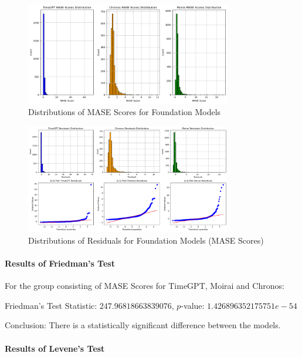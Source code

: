 \documentclass[12pt,a4paper]{article}
\begin{document}
\begin{figure}[htbp]
  \centering
  \includegraphics[width=0.8\textwidth]{mase_distribution_e.png}
  \caption{Distributions of MASE Scores for Foundation Models}
  \label{mase_distribution_e}
\end{figure}

\begin{figure}[htbp]
  \centering
  \includegraphics[width=0.8\textwidth]{residuals_distribution_e.png}
  \caption{Distributions of Residuals for Foundation Models (MASE Scores)} 
  \label{residuals_distribution_e}
\end{figure}

\paragraph*{Results of Friedman's Test}

For the group consisting of MASE Scores for TimeGPT, Moirai and Chronos:

Friedman’s Test Statistic: $247.96818663839076$, $p$-value: $1.426896352175751e-54$

Conclusion: There is a statistically significant difference between the models.

\paragraph*{Results of Levene's Test}
\end{document}

